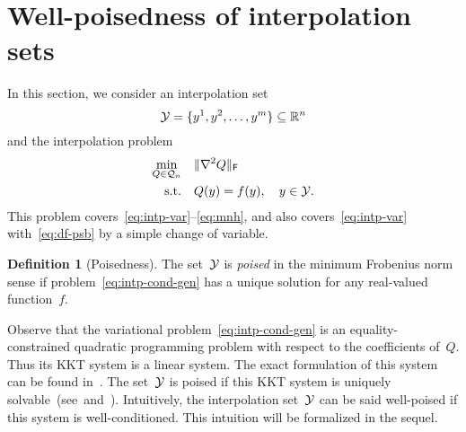 \documentclass[draft]{article}
\numberwithin{equation}{section}
\theoremstyle{definition}
\newtheorem{definition}{Definition}[section]
\theoremstyle{plain}
\theoremstyle{remark}
\newcommand*{\norm}[2][]{#1\lVert#2#1\rVert}
\newcommand*{\obj}{f}
\newcommand*{\objm}[1][]{\hat{\obj}\ifblank{#1}{}{^{#1}}}
\newcommand*{\qpoly}{\mathcal{Q}_n}
\newcommand*{\R}{\mathbb{R}}
\newcommand*{\set}[2][]{#1\{#2#1\}}
\newcommand*{\xpt}[1][]{\mathcal{Y}\ifblank{#1}{}{^{#1}}}
\begin{document}
\section{Well-poisedness of interpolation sets}
\label{sec:well-poisedness}

In this section, we consider an interpolation set
\begin{equation*}
    \xpt = \set{y^1, y^2, \dots, y^m} \subseteq \R^n
\end{equation*}
and the interpolation problem
\begin{equation}
    \label{eq:intp-cond-gen}
    \begin{aligned}
        \min_{Q \in \qpoly} & \quad \norm{\nabla^2 Q}_\textsf{F}\\
        \text{s.t.}         & \quad Q(y) = \obj(y), \quad y \in \xpt.
    \end{aligned}
\end{equation}
This problem covers~\eqref{eq:intp-var}--\eqref{eq:mnh}, and also covers~\eqref{eq:intp-var} with~\eqref{eq:df-psb} by a simple change of variable.


\begin{definition}[Poisedness]
    The set~$\xpt$ is \emph{poised} in the minimum Frobenius norm sense if problem~\eqref{eq:intp-cond-gen} has a unique solution for any real-valued function~$\obj$.
\end{definition}

Observe that the variational problem~\eqref{eq:intp-cond-gen} is an equality-constrained quadratic
programming problem with respect to the coefficients of~$Q$. Thus its KKT system is a linear system.
The exact formulation of this system can be found in~\cite{Powell_2004a,Powell_2004b}.
The set~$\xpt$ is poised if this KKT system is uniquely solvable~(see~\mbox{\cite[\S~2]{Powell_2004a}}and~\cite[\S~5.3]{Conn_Scheinberg_Vicente_2009}).
Intuitively, the interpolation set~$\xpt$ can be said well-poised if this system is well-conditioned.
This intuition will be formalized in the sequel.
\end{document}
